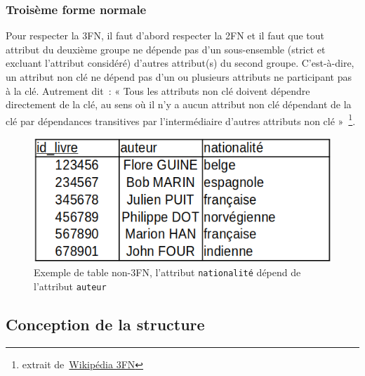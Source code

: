 \documentclass[12pt]{article}
\begin{document}
        \subsubsection{Troisème forme normale}
            Pour respecter la 3FN, il faut d'abord respecter la 2FN et il faut que tout attribut du deuxième groupe ne dépende pas d’un sous-ensemble (strict et excluant l’attribut considéré) d’autres attribut(s) du second groupe. C'est-à-dire, un attribut non clé ne dépend pas d’un ou plusieurs attributs ne participant pas à la clé. Autrement dit~: « Tous les attributs non clé doivent dépendre directement de la clé, au sens où il n’y a aucun attribut non clé dépendant de la clé par dépendances transitives par l’intermédiaire d’autres attributs non clé »~\footnote{extrait de~\href{https://fr.wikipedia.org/wiki/Forme\_normale\_(bases\_de\_données\_relationnelles)}{\textsf{Wikipédia 3FN}}}.
            \begin{figure}[!h]
                \centering
                \includegraphics[scale = 0.5]{Images/Etat de l'art/non-3FN.png}
                \caption{Exemple de table non-3FN, l'attribut \texttt{nationalité} dépend de l'attribut \texttt{auteur}}
                \label{fig:non-3FN}
            \end{figure}
    
    \subsection{Conception de la structure}
    
\end{document}
